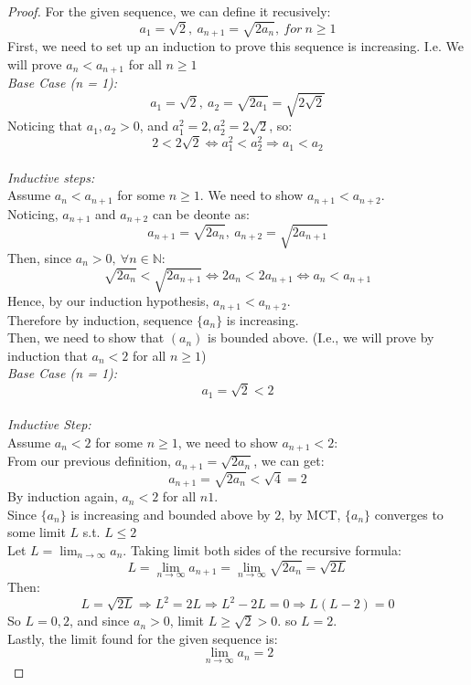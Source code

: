 \documentclass{article}
\begin{document}
\begin{proof}
    For the given sequence, we can define it recusively:
    \[ a_1 = \sqrt{2}, \ a_{n + 1} = \sqrt{2a_n}, \ for \ n \geq 1 \]
    First, we need to set up an induction to prove this sequence is increasing. I.e. We will prove $a_n < a_{n + 1}$ for all $n \geq 1$
    \\
    \textit{Base Case (n = 1):}
    \\
    \[ a_1 = \sqrt{2}, \ a_2 = \sqrt{2a_1} = \sqrt{2\sqrt{2}} \]
    Noticing that $a_1, a_2 > 0$, and $a_1^2 = 2, a_2^2 = 2\sqrt{2}$, so:
    \[ 2 < 2\sqrt{2} \Leftrightarrow a_1^2 < a_2^2 \Rightarrow a_1 < a_2 \]
    \\
    \textit{Inductive steps:}
    \\
    Assume $a_n < a_{n + 1}$ for some $n \geq 1$. We need to show $a_{n + 1} < a_{n + 2}$.
    \\
    Noticing, $a_{n + 1}$ and $a_{n + 2}$ can be deonte as:
    \[ a_{n + 1} = \sqrt{2a_n}, \ a_{n + 2} = \sqrt{2a_{n+1}} \]
    Then, since $a_n > 0, \ \forall n \in \mathbb{N}$:
    \[ \sqrt{2a_n} < \sqrt{2a_{n+1}} \Leftrightarrow 2a_n < 2a_{n+1} \Leftrightarrow a_n < a_{n+1} \]
    Hence, by our induction hypothesis, $a_{n + 1} < a_{n + 2}$. 
    \\
    Therefore by induction, sequence $\{a_n\}$ is increasing.
    \\
    Then, we need to show that $(a_n)$ is bounded above. (I.e., we will prove by induction that $a_n < 2$ for all $n \geq 1$)
    \\
    \textit{Base Case (n = 1):}
    \\
    \[ a_1 = \sqrt{2} < 2 \]
    \\
    \textit{Inductive Step:}
    \\
    Assume $a_n < 2$ for some $n \geq 1$, we need to show $a_{n + 1} < 2$:
    \\
    From our previous definition, $a_{n + 1} = \sqrt{2 a_n}$, we can get: 
    \[ a_{n + 1} = \sqrt{2a_n} < \sqrt{4} = 2 \]
    By induction again, $a_n < 2$ for all $n  1$.
    \\
    Since $\{a_n \}$ is increasing and bounded above by $2$, by MCT, $\{a_n\}$ converges to some limit $L$ s.t. $L \leq 2$
    \\
    Let $L = \lim_{n \rightarrow \infty} a_n$. Taking limit both sides of the recursive formula:
    \[ L = \lim_{n \rightarrow \infty} a_{n + 1} = \lim_{n \rightarrow \infty} \sqrt{2a_n} = \sqrt{2L} \]
    Then:
    \[ L = \sqrt{2L} \Longrightarrow L^2 = 2L \Longrightarrow L^2 - 2L = 0 \Longrightarrow L(L - 2) = 0 \]
    So $L = 0, 2$, and since $a_n > 0$, limit $L \geq \sqrt{2} > 0$. so $L = 2$.
    \\
    Lastly, the limit found for the given sequence is:
    \[ \lim_{n \rightarrow \infty} a_n = 2 \]    
\end{proof}
\end{document}
